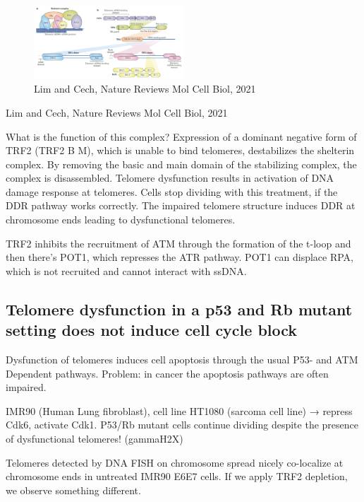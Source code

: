 \begin{figure}
\centering
\includegraphics[width=0.5\textwidth]{../_resources/Screen_Shot_2022-12-15_at_17-43-24.png}
\caption{Lim and Cech, Nature Reviews Mol Cell Biol, 2021}
\end{figure}

Lim and Cech, Nature Reviews Mol Cell Biol, 2021

What is the function of this complex? Expression of a dominant negative
form of TRF2 (TRF2 B M), which is unable to bind telomeres, destabilizes
the shelterin complex. By removing the basic and main domain of the
stabilizing complex, the complex is disassembled. Telomere dysfunction
results in activation of DNA damage response at telomeres. Cells stop
dividing with this treatment, if the DDR pathway works correctly. The
impaired telomere structure induces DDR at chromosome ends leading to
dysfunctional telomeres.

TRF2 inhibits the recruitment of ATM through the formation of the t-loop
and then there's POT1, which represses the ATR pathway. POT1 can
displace RPA, which is not recruited and cannot interact with ssDNA.

\hypertarget{telomere-dysfunction-in-a-p53-and-rb-mutant-setting-does-not-induce-cell-cycle-block}{%
\subsection{Telomere dysfunction in a p53 and Rb mutant setting does not
induce cell cycle
block}\label{telomere-dysfunction-in-a-p53-and-rb-mutant-setting-does-not-induce-cell-cycle-block}}

Dysfunction of telomeres induces cell apoptosis through the usual P53-
and ATM Dependent pathways. Problem: in cancer the apoptosis pathways
are often impaired.

IMR90 (Human Lung fibroblast), cell line HT1080 (sarcoma cell line) →
repress Cdk6, activate Cdk1. P53/Rb mutant cells continue dividing
despite the presence of dysfunctional telomeres! (gammaH2X)

Telomeres detected by DNA FISH on chromosome spread nicely co-localize
at chromosome ends in untreated IMR90 E6E7 cells. If we apply TRF2
depletion, we observe something different.

